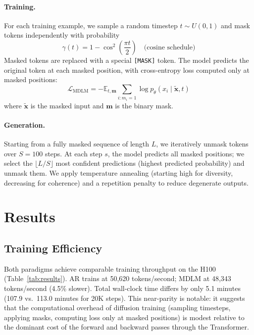 \documentclass[11pt,a4paper]{article}
\begin{document}
\paragraph{Training.}
For each training example, we sample a random timestep $t \sim U(0,1)$ and mask tokens independently with probability
\begin{equation}
  \gamma(t) = 1 - \cos^2\!\left(\frac{\pi t}{2}\right) \quad \text{(cosine schedule)}
\end{equation}
Masked tokens are replaced with a special \texttt{[MASK]} token.
The model predicts the original token at each masked position, with cross-entropy loss computed only at masked positions:
\begin{equation}
  \mathcal{L}_{\text{MDLM}} = -\mathbb{E}_{t,\mathbf{m}} \sum_{i : m_i = 1} \log p_\theta(x_i \mid \tilde{\mathbf{x}}, t)
\end{equation}
where $\tilde{\mathbf{x}}$ is the masked input and $\mathbf{m}$ is the binary mask.

\paragraph{Generation.}
Starting from a fully masked sequence of length $L$, we iteratively unmask tokens over $S = 100$ steps.
At each step $s$, the model predicts all masked positions; we select the $\lfloor L / S \rfloor$ most confident predictions (highest predicted probability) and unmask them.
We apply temperature annealing (starting high for diversity, decreasing for coherence) and a repetition penalty to reduce degenerate outputs.

\section{Results}

\subsection{Training Efficiency}

Both paradigms achieve comparable training throughput on the H100 (Table~\ref{tab:results}).
AR trains at 50{,}620 tokens/second; MDLM at 48{,}343 tokens/second (4.5\% slower).
Total wall-clock time differs by only 5.1 minutes (107.9 vs.\ 113.0 minutes for 20K steps).
This near-parity is notable: it suggests that the computational overhead of diffusion training (sampling timesteps, applying masks, computing loss only at masked positions) is modest relative to the dominant cost of the forward and backward passes through the Transformer.
\end{document}
